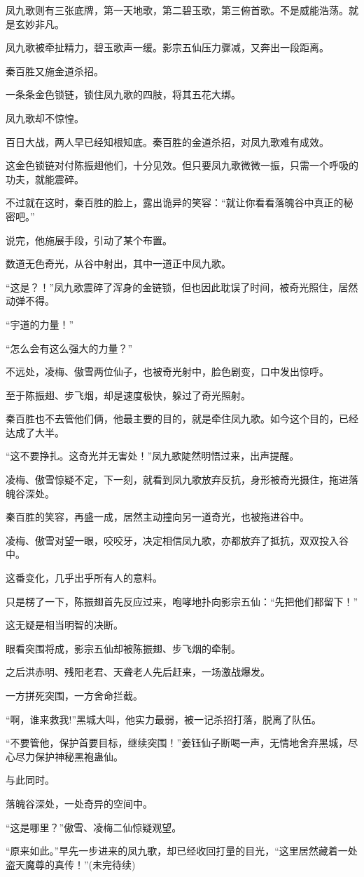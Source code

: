 \begin{this_body}
凤九歌则有三张底牌，第一天地歌，第二碧玉歌，第三俯首歌。不是威能浩荡。就是玄妙非凡。

凤九歌被牵扯精力，碧玉歌声一缓。影宗五仙压力骤减，又奔出一段距离。

秦百胜又施金道杀招。

一条条金色锁链，锁住凤九歌的四肢，将其五花大绑。

凤九歌却不惊惶。

百日大战，两人早已经知根知底。秦百胜的金道杀招，对凤九歌难有成效。

这金色锁链对付陈振翅他们，十分见效。但只要凤九歌微微一振，只需一个呼吸的功夫，就能震碎。

不过就在这时，秦百胜的脸上，露出诡异的笑容：“就让你看看落魄谷中真正的秘密吧。”

说完，他施展手段，引动了某个布置。

数道无色奇光，从谷中射出，其中一道正中凤九歌。

“这是？！”凤九歌震碎了浑身的金链锁，但也因此耽误了时间，被奇光照住，居然动弹不得。

“宇道的力量！”

“怎么会有这么强大的力量？”

不远处，凌梅、傲雪两位仙子，也被奇光射中，脸色剧变，口中发出惊呼。

至于陈振翅、步飞烟，却是速度极快，躲过了奇光照射。

秦百胜也不去管他们俩，他最主要的目的，就是牵住凤九歌。如今这个目的，已经达成了大半。

“这不要挣扎。这奇光并无害处！”凤九歌陡然明悟过来，出声提醒。

凌梅、傲雪惊疑不定，下一刻，就看到凤九歌放弃反抗，身形被奇光摄住，拖进落魄谷深处。

秦百胜的笑容，再盛一成，居然主动撞向另一道奇光，也被拖进谷中。

凌梅、傲雪对望一眼，咬咬牙，决定相信凤九歌，亦都放弃了抵抗，双双投入谷中。

这番变化，几乎出乎所有人的意料。

只是楞了一下，陈振翅首先反应过来，咆哮地扑向影宗五仙：“先把他们都留下！”

这无疑是相当明智的决断。

眼看突围将成，影宗五仙却被陈振翅、步飞烟的牵制。

之后洪赤明、残阳老君、天聋老人先后赶来，一场激战爆发。

一方拼死突围，一方舍命拦截。

“啊，谁来救我!”黑城大叫，他实力最弱，被一记杀招打落，脱离了队伍。

“不要管他，保护首要目标，继续突围！”姜钰仙子断喝一声，无情地舍弃黑城，尽心尽力保护神秘黑袍蛊仙。

与此同时。

落魄谷深处，一处奇异的空间中。

“这是哪里？”傲雪、凌梅二仙惊疑观望。

“原来如此。”早先一步进来的凤九歌，却已经收回打量的目光，“这里居然藏着一处盗天魔尊的真传！”(未完待续)

\end{this_body}

